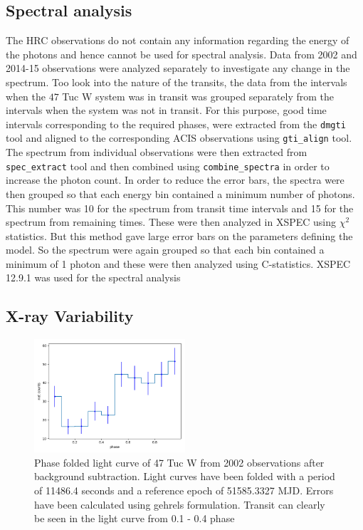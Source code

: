 \documentclass[a4paper,fleqn,usenatbib]{mnras}
\begin{document}
\subsection{Spectral analysis}
The HRC observations do not contain any information regarding the energy of the photons and hence cannot be used for spectral analysis.
Data from 2002 and 2014-15 observations were analyzed separately to investigate any change in the spectrum. Too look into the nature
of the transits, the data from the intervals when the $47$ Tuc W system was in transit was grouped separately from the intervals when
the system was not in transit. For this purpose, good time intervals corresponding to the required phases, were extracted from the
\texttt{dmgti} tool and aligned to the corresponding ACIS observations using \texttt{gti\_align} tool. The spectrum from individual
observations were then extracted from \texttt{spec\_extract} tool and then combined using \texttt{combine\_spectra} in order to increase
the photon count. In order to reduce the error bars, the spectra were then grouped so that each energy bin contained a minimum number
of photons. This number was 10 for the spectrum from transit time intervals and 15 for the spectrum from remaining times. These were then analyzed in XSPEC using $\chi^2$ statistics. But this method gave large error bars on the parameters defining the model. So the spectrum were again grouped so that each bin contained a minimum of 1 photon and these were then analyzed using C-statistics. XSPEC 12.9.1 was used for the spectral analysis

\subsection{X-ray Variability}

\begin{figure}
  \centering
  \includegraphics[width=0.5\textwidth]{Figures/2002_1filt.png}
 \caption{Phase folded light curve of 47 Tuc W from 2002 observations after background subtraction. Light curves have been folded 
 with a period of 11486.4 seconds  and a reference epoch of 51585.3327 MJD. Errors have been calculated using gehrels formulation.
 Transit can clearly be seen in the light curve from 0.1 - 0.4 phase }
 \label{fig:2002_full}
\end{figure}
\end{document}
